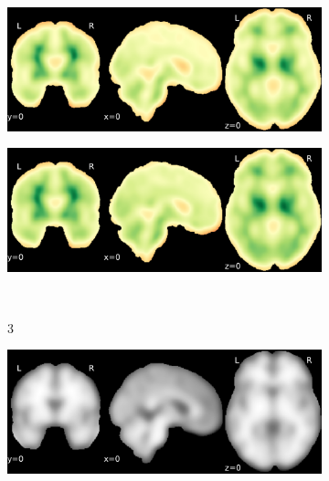 \documentclass{article}
\begin{document}
\begin{landscape}
\begin{figure}
\begin{subfigure}[t]{0.2\paperheight}
        \end{subfigure}
        \begin{subfigure}[t]{0.2\paperheight}
            \centering
            \includegraphics[width=\textwidth]{figures/sig/15mm/rs_ds001771_sub-36_sig.pdf}
        \end{subfigure}
        \begin{subfigure}[t]{0.2\paperheight}
            \centering
            \includegraphics[width=\textwidth]{figures/sig/15mm/rr.rs_ds001771_sub-36_sig.pdf}
        \end{subfigure} \\
        \begin{subfigure}[b][][c]{0.01\paperwidth} 3 \vspace*{15pt} \end{subfigure}
        \begin{subfigure}[t]{0.2\paperheight}
            \centering
            \includegraphics[width=\textwidth]{figures/sig/15mm/ieee_ds000256_sub-CTS201.pdf}

\end{subfigure}
\end{figure}
\end{landscape}
\end{document}

